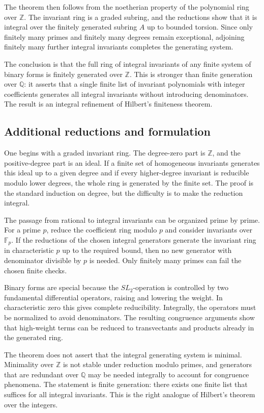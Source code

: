 \documentclass[12pt]{article}
\begin{document}
The theorem then follows from the noetherian property of the polynomial ring over \(\mathbb Z\). The
invariant ring is a graded subring, and the reductions show that it is integral over the finitely
generated subring \(A\) up to bounded torsion. Since only finitely many primes and finitely many
degrees remain exceptional, adjoining finitely many further integral invariants completes the
generating system.


The conclusion is that the full ring of integral invariants of any finite system of binary forms is
finitely generated over \(\mathbb Z\). This is stronger than finite generation over \(\mathbb Q\):
it asserts that a single finite list of invariant polynomials with integer coefficients generates
all integral invariants without introducing denominators. The result is an integral refinement of
Hilbert's finiteness theorem.


\subsection{Additional reductions and formulation}

One begins with a graded invariant ring. The degree-zero part is \(\mathbb Z\), and the
positive-degree part is an ideal. If a finite set of homogeneous invariants generates this ideal up
to a given degree and if every higher-degree invariant is reducible modulo lower degrees, the whole
ring is generated by the finite set. The proof is the standard induction on degree, but the
difficulty is to make the reduction integral.

The passage from rational to integral invariants can be organized prime by prime. For a prime \(p\),
reduce the coefficient ring modulo \(p\) and consider invariants over \(\mathbb F_p\). If the
reductions of the chosen integral generators generate the invariant ring in characteristic \(p\) up
to the required bound, then no new generator with denominator divisible by \(p\) is needed. Only
finitely many primes can fail the chosen finite checks.

Binary forms are special because the \(SL_2\)-operation is controlled by two fundamental
differential operators, raising and lowering the weight. In characteristic zero this gives complete
reducibility. Integrally, the operators must be normalized to avoid denominators. The resulting
congruence arguments show that high-weight terms can be reduced to transvectants and products
already in the generated ring.

The theorem does not assert that the integral generating system is minimal. Minimality over
\(\mathbb Z\) is not stable under reduction modulo primes, and generators that are redundant over
\(\mathbb Q\) may be needed integrally to account for congruence phenomena. The statement is finite
generation: there exists one finite list that suffices for all integral invariants. This is the
right analogue of Hilbert's theorem over the integers.
\end{document}
